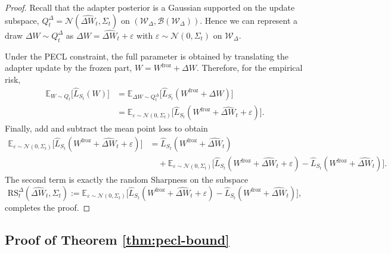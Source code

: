 \documentclass{article}
\theoremstyle{plain}
\theoremstyle{definition}
\theoremstyle{remark}
\begin{document}
\begin{proof}
Recall that the adapter posterior is a Gaussian supported on the update subspace,
$
Q_t^\Delta = \mathcal N(\hat{\Delta W}_t,\Sigma_t)
$
on $(\mathcal W_\Delta,\mathcal B(\mathcal W_\Delta))$.
Hence we can represent a draw $\Delta W \sim Q_t^\Delta$ as
$
\Delta W = \hat{\Delta W}_t + \varepsilon
$
with $\varepsilon \sim \mathcal N(0,\Sigma_t)$ on $\mathcal W_\Delta$.

Under the PECL constraint, the full parameter is obtained by translating the adapter update by the frozen part,
$
W = W^{\mathrm{froz}} + \Delta W.
$
Therefore, for the empirical risk,
\begin{align*}
\mathbb E_{W \sim Q_t}\big[\hat L_{S_t}(W)\big]
&= \mathbb E_{\Delta W \sim Q_t^\Delta}\big[\hat L_{S_t}(W^{\mathrm{froz}}+\Delta W)\big] \\
&= \mathbb E_{\varepsilon \sim \mathcal N(0,\Sigma_t)}
\big[\hat L_{S_t}(W^{\mathrm{froz}}+\hat{\Delta W}_t+\varepsilon)\big].
\end{align*}
Finally, add and subtract the mean point loss to obtain
\begin{align*}
\mathbb E_{\varepsilon \sim \mathcal N(0,\Sigma_t)}
\big[\hat L_{S_t}(W^{\mathrm{froz}}+\hat{\Delta W}_t+\varepsilon)\big]
&=
\hat L_{S_t}(W^{\mathrm{froz}}+\hat{\Delta W}_t) \\
&\quad +
\mathbb E_{\varepsilon \sim \mathcal N(0,\Sigma_t)}
\Big[
\hat L_{S_t}(W^{\mathrm{froz}}+\hat{\Delta W}_t+\varepsilon)
-
\hat L_{S_t}(W^{\mathrm{froz}}+\hat{\Delta W}_t)
\Big].
\end{align*}
The second term is exactly the random Sharpness on the subspace
\[
\mathrm{RS}_t^\Delta(\hat{\Delta W}_t,\Sigma_t)
:=
\mathbb E_{\varepsilon \sim \mathcal N(0,\Sigma_t)}
\Big[
\hat L_{S_t}(W^{\mathrm{froz}}+\hat{\Delta W}_t+\varepsilon)
-
\hat L_{S_t}(W^{\mathrm{froz}}+\hat{\Delta W}_t)
\Big],
\]
completes the proof.
\end{proof}



\subsection{Proof of Theorem \ref{thm:pecl-bound}}
\label{proof:theorem}

\end{document}
